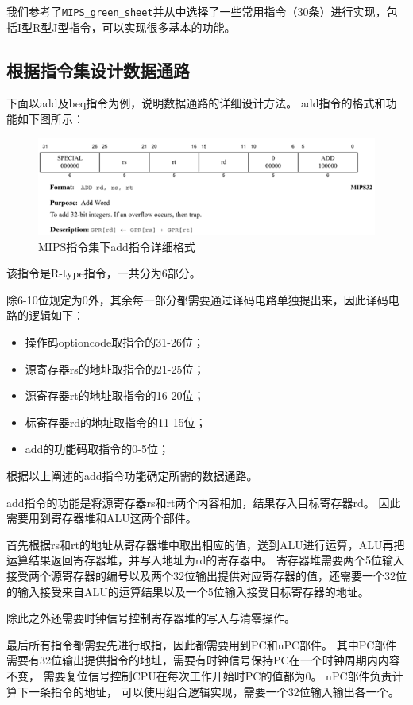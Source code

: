 \documentclass[UTF8]{article}
\begin{document}
我们参考了\lstinline{MIPS_green_sheet}并从中选择了一些常用指令（30条）进行实现，包括I型R型J型指令，可以实现很多基本的功能。

\subsection{根据指令集设计数据通路}

下面以add及beq指令为例，说明数据通路的详细设计方法。
add指令的格式和功能如下图所示：


\begin{figure}[H]
    \centering
    \includegraphics[width=\linewidth]{0.png}
    \caption{MIPS指令集下add指令详细格式}
    \label{FIG1}
\end{figure}

该指令是R-type指令，一共分为6部分。

除6-10位规定为0外，其余每一部分都需要通过译码电路单独提出来，因此译码电路的逻辑如下：
\begin{itemize}
\item 操作码optioncode取指令的31-26位；
\item 源寄存器rs的地址取指令的21-25位；
\item 源寄存器rt的地址取指令的16-20位；
\item 标寄存器rd的地址取指令的11-15位；
\item add的功能码取指令的0-5位；
\end{itemize}
根据以上阐述的add指令功能确定所需的数据通路。

add指令的功能是将源寄存器rs和rt两个内容相加，结果存入目标寄存器rd。
因此需要用到寄存器堆和ALU这两个部件。

首先根据rs和rt的地址从寄存器堆中取出相应的值，送到ALU进行运算，ALU再把运算结果返回寄存器堆，并写入地址为rd的寄存器中。
寄存器堆需要两个5位输入接受两个源寄存器的编号以及两个32位输出提供对应寄存器的值，还需要一个32位的输入接受来自ALU的运算结果以及一个5位输入接受目标寄存器的地址。

除此之外还需要时钟信号控制寄存器堆的写入与清零操作。

最后所有指令都需要先进行取指，因此都需要用到PC和nPC部件。
其中PC部件需要有32位输出提供指令的地址，需要有时钟信号保持PC在一个时钟周期内内容不变，
需要复位信号控制CPU在每次工作开始时PC的值都为0。
nPC部件负责计算下一条指令的地址，
可以使用组合逻辑实现，需要一个32位输入输出各一个。
\end{document}
